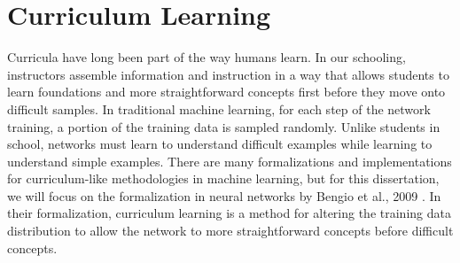 \section{Curriculum Learning}
\label{chap:intro:sec:cl}
Curricula have long been part of the way humans learn. In our schooling, instructors assemble information and instruction in a way that allows students to learn foundations and more straightforward concepts first before they move onto difficult samples. In traditional machine learning, for each step of the network training, a portion of the training data is sampled randomly. Unlike students in school, networks must learn to understand difficult examples while learning to understand simple examples. There are many formalizations and implementations for curriculum-like methodologies in machine learning, but for this dissertation, we will focus on the formalization in neural networks by Bengio et al., 2009 \cite{Bengio2009CurriculumL}. In their formalization, curriculum learning is a method for altering the training data distribution to allow the network to more straightforward concepts before difficult concepts.
